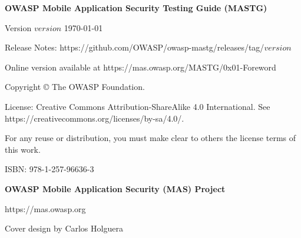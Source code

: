 \thispagestyle{empty} %

\textbf{OWASP Mobile Application Security Testing Guide (MASTG)}

Version $version$ \today

Release Notes: https://github.com/OWASP/owasp-mastg/releases/tag/$version$

Online version available at https://mas.owasp.org/MASTG/0x01-Foreword

Copyright © The OWASP Foundation. 

License: Creative Commons Attribution-ShareAlike 4.0 International. See https://creativecommons.org/licenses/by-sa/4.0/.

For any reuse or distribution, you must make clear to others the license terms of this work.

ISBN: 978-1-257-96636-3 


\textbf{OWASP Mobile Application Security (MAS) Project}

https://mas.owasp.org


Cover design by Carlos Holguera